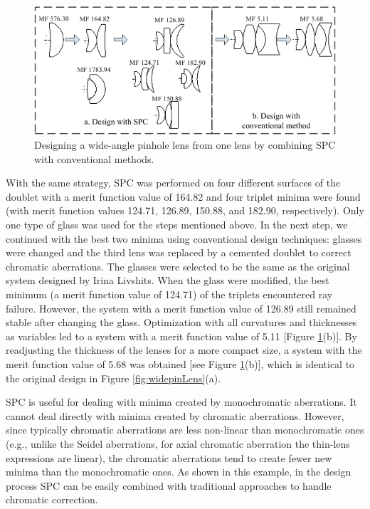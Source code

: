 \begin{figure}[h!]
    \centering
    \includegraphics[width=1.0\textwidth]{chapter-3/figures/WideAngleDesign.png}
    \caption{Designing a wide-angle pinhole lens from one lens by combining SPC with conventional methods.}
    \label{fig:WideAngleDesign}
\end{figure}

With the same strategy, SPC was performed on four different surfaces of the doublet with a merit function value of 164.82 and four triplet minima were found (with merit function values 124.71, 126.89, 150.88, and 182.90, respectively). Only one type of glass was used for the steps mentioned above. In the next step, we continued with the best two minima using conventional design techniques: glasses were changed and the third lens was replaced by a cemented doublet to correct chromatic aberrations. The glasses were selected to be the same as the original system designed by Irina Livshits. When the glass were modified, the best minimum (a merit function value of 124.71) of the triplets encountered ray failure. However, the system with a merit function value of 126.89 still remained stable after changing the glass. Optimization with all curvatures and thicknesses as variables led to a system with a merit function value of 5.11 [Figure \ref{fig:WideAngleDesign}(b)]. By readjusting the thickness of the lenses for a more compact size, a system with the merit function value of 5.68 was obtained [see Figure \ref{fig:WideAngleDesign}(b)], which is identical to the original design in Figure \ref{fig:widepinLens}(a).

SPC is useful for dealing with minima created by monochromatic aberrations. It cannot deal directly with minima created by chromatic aberrations. However, since typically chromatic aberrations are less non-linear than monochromatic ones (e.g., unlike the Seidel aberrations, for axial chromatic aberration the thin-lens expressions are linear), the chromatic aberrations tend to create fewer new minima than the monochromatic
ones. As shown in this example, in the design process SPC can be easily combined with traditional approaches to handle chromatic correction.

